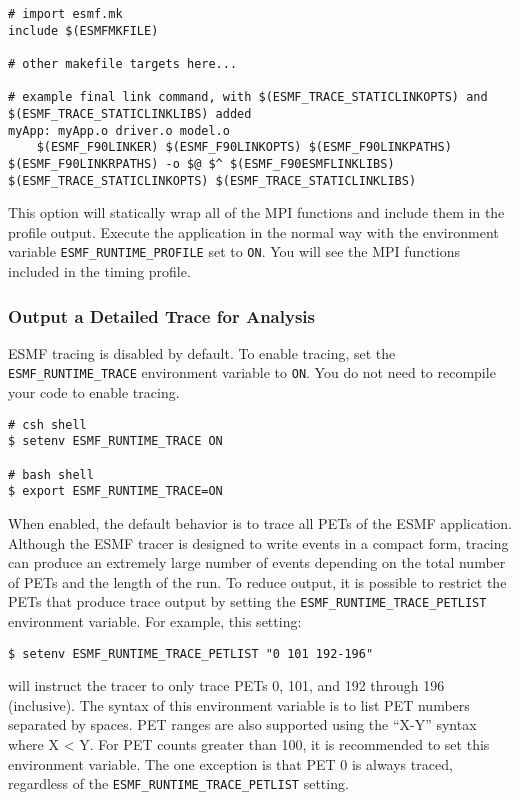 \begin{verbatim}
# import esmf.mk
include $(ESMFMKFILE)

# other makefile targets here...

# example final link command, with $(ESMF_TRACE_STATICLINKOPTS) and $(ESMF_TRACE_STATICLINKLIBS) added
myApp: myApp.o driver.o model.o
	$(ESMF_F90LINKER) $(ESMF_F90LINKOPTS) $(ESMF_F90LINKPATHS) $(ESMF_F90LINKRPATHS) -o $@ $^ $(ESMF_F90ESMFLINKLIBS) $(ESMF_TRACE_STATICLINKOPTS) $(ESMF_TRACE_STATICLINKLIBS)
\end{verbatim}

This option will statically wrap all of the MPI functions and include them
in the profile output.  Execute the application in the normal way
with the environment variable {\tt ESMF\_RUNTIME\_PROFILE} set to {\tt ON}.
You will see the MPI functions included in the timing profile.

\subsubsection{Output a Detailed Trace for Analysis}


ESMF tracing is disabled by default. To enable tracing, set the
{\tt ESMF\_RUNTIME\_TRACE} environment variable to {\tt ON}. You
do not need to recompile your code to enable tracing.

\begin{verbatim}
# csh shell
$ setenv ESMF_RUNTIME_TRACE ON

# bash shell
$ export ESMF_RUNTIME_TRACE=ON
\end{verbatim}

When enabled, the default behavior is to trace all PETs of the
ESMF application. Although the ESMF tracer is designed to write
events in a compact form, tracing can produce an extremely
large number of events depending on the total number of PETs and
the length of the run. To reduce output, it is possible to restrict
the PETs that produce trace output by setting the {\tt ESMF\_RUNTIME\_TRACE\_PETLIST}
environment variable. For example, this setting:

\begin{verbatim}
$ setenv ESMF_RUNTIME_TRACE_PETLIST "0 101 192-196"
\end{verbatim}

will instruct the tracer to only trace PETs 0, 101, and 192 through 196
(inclusive). The syntax of this environment variable is to list
PET numbers separated by spaces. PET ranges are also supported using
the ``X-Y'' syntax where X < Y. For PET counts greater than 100, it is
recommended to set this environment variable. The one exception is that
PET 0 is always traced, regardless of the {\tt ESMF\_RUNTIME\_TRACE\_PETLIST}
setting.

